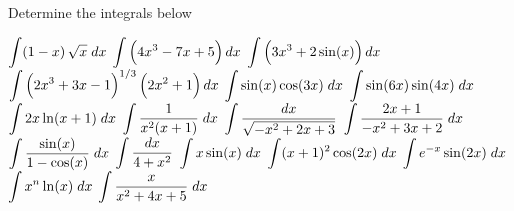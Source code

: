 \ifcalculus \pagebreak \fi
\subsection*{}
\ifcalculus
\begin{Exercise} Determine the integrals below 
	\begin{multicols}{2}
	\Question[difficulty = 1] $\displaystyle \int (1-x)\,\sqrt{x}\; dx$
	\Question[difficulty = 1] $\displaystyle \int \left(4x^3-7x+5\right) dx$
	\Question[difficulty = 1] $\displaystyle \int \left(3x^3+2\sin(x)\right) dx$
	\Question[difficulty = 1] $\displaystyle \int \left(2x^3+3x-1\right)^{1/3}\left(2x^2+1\right) dx$
	\Question[difficulty = 1] $\displaystyle \int \sin(x)\cos(3x)\; dx$
	\Question[difficulty = 1] $\displaystyle \int \sin(6x)\sin(4x)\; dx$
	\Question[difficulty = 1] $\displaystyle \int 2x \ln(x+1) \; dx $ %
	\Question[difficulty = 1] $\displaystyle \int\dfrac{1}{x^2(x+1)}\; dx $
	\Question[difficulty = 1] $\displaystyle \int\dfrac{dx}{\sqrt{-x^2+2x+3}} $ %
	\Question[difficulty = 1] $\displaystyle \int\dfrac{2x+1}{-x^2+3x+2}\; dx $ %
	\Question[difficulty = 1] $\displaystyle \int \dfrac{\sin(x)}{1-\cos(x)}\; dx$
	\Question[difficulty = 1] $\displaystyle \int \dfrac{dx}{4+x^2}$
	\Question[difficulty = 1] $\displaystyle \int x\sin(x)\; dx$
	\Question[difficulty = 1] $\displaystyle \int (x+1)^2\cos(2x)\; dx$
	\Question[difficulty = 1] $\displaystyle \int e^{-x}\sin(2x)\; dx$
	\Question[difficulty = 1] $\displaystyle \int x^n\ln(x)\; dx$
	\Question[difficulty = 2] $\displaystyle \int \dfrac{x}{x^2+4x+5}\; dx$
    \EndCurrentQuestion
	\end{multicols}
\end{Exercise}

